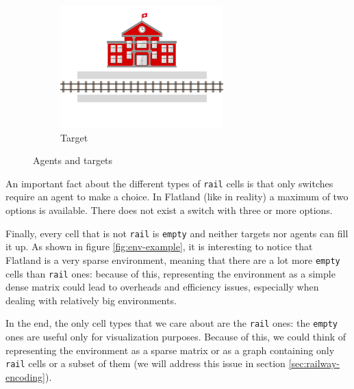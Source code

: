\documentclass[a4paper,10pt]{report}
\begin{document}
\begin{figure}[h]
\begin{subfigure}[t]{.25\linewidth}
		\includegraphics[width=\textwidth]{target.png}
		\caption{Target}
		\label{fig:target}
	\end{subfigure}%
	\caption{Agents and targets}
	\label{fig:agent-target}
\end{figure}

An important fact about the different types of \texttt{rail} cells is that only switches require an agent to make a choice. In Flatland (like in reality) a maximum of two options is available. There does not exist a switch with three or more options.

Finally, every cell that is not \texttt{rail} is \texttt{empty} and neither targets nor agents can fill it up. As shown in figure \ref{fig:env-example}, it is interesting to notice that Flatland is a very sparse environment, meaning that there are a lot more \texttt{empty} cells than \texttt{rail} ones: because of this, representing the environment as a simple dense matrix could lead to overheads and efficiency issues, especially when dealing with relatively big environments.

In the end, the only cell types that we care about are the \texttt{rail} ones: the \texttt{empty} ones are useful only for visualization purposes. Because of this, we could think of representing the environment as a sparse matrix or as a graph containing only \texttt{rail} cells or a subset of them (we will address this issue in section \ref{sec:railway-encoding}).
\end{document}
